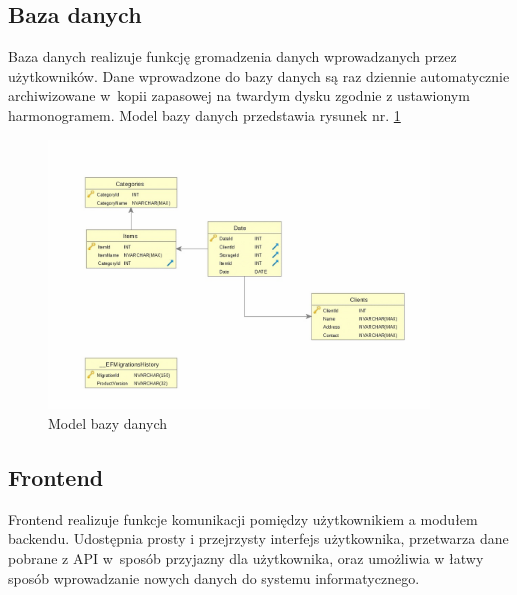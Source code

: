 \documentclass[12pt,a4paper]{article}
\begin{document}
		\subsection{Baza danych}
		\indent Baza danych realizuje funkcję gromadzenia danych wprowadzanych przez użytkowników. Dane wprowadzone do bazy danych są raz dziennie automatycznie archiwizowane
			w~kopii zapasowej na twardym dysku zgodnie z ustawionym harmonogramem. Model bazy danych przedstawia rysunek nr. \ref{fig:db_model}\\
		\begin{figure}[H]
			\centering
			\includegraphics[width=0.9\textwidth]{img/model_bazy_danych.jpg}
			\caption{Model bazy danych}
		\label{fig:db_model}
		\end{figure}
		\subsection{Frontend}
		\indent Frontend realizuje funkcje komunikacji pomiędzy użytkownikiem a modułem backendu. Udostępnia prosty i przejrzysty interfejs użytkownika, przetwarza
			dane pobrane z API w~sposób przyjazny dla użytkownika, oraz umożliwia w łatwy sposób wprowadzanie nowych danych do systemu informatycznego.\\	
\end{document}
